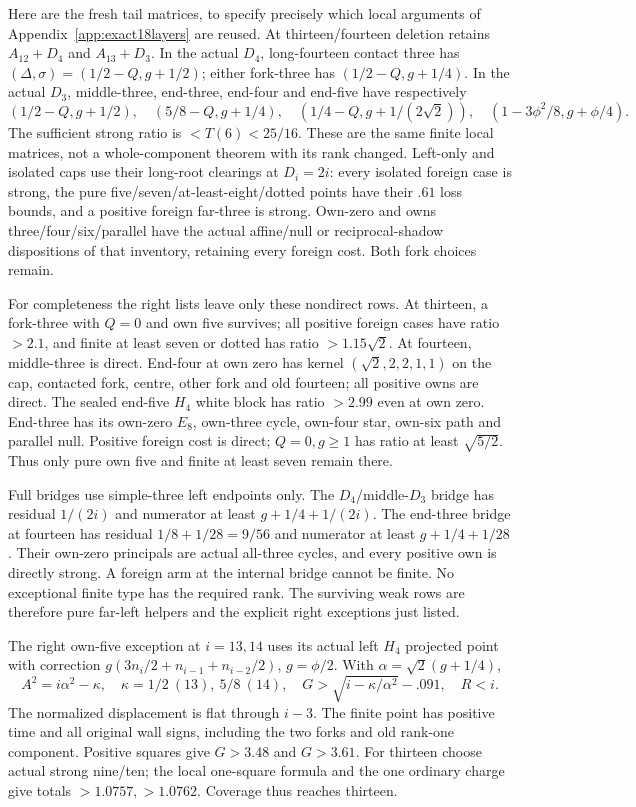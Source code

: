\documentclass[11pt]{article}
\theoremstyle{definition}
\theoremstyle{remark}
\begin{document}
Here are the fresh tail matrices, to specify precisely which local
arguments of Appendix~\ref{app:exact18layers} are reused. At
thirteen/fourteen deletion retains \(A_{12}+D_4\) and
\(A_{13}+D_3\). In the actual \(D_4\), long-fourteen contact
three has \((\Delta,\sigma)=(1/2-Q,g+1/2)\); either fork-three
has \((1/2-Q,g+1/4)\). In the actual \(D_3\), middle-three,
end-three, end-four and end-five have respectively
\[
 (1/2-Q,g+1/2),\quad(5/8-Q,g+1/4),\quad
 (1/4-Q,g+1/(2\sqrt2)),\quad
 (1-3\phi^2/8,g+\phi/4).
\]
The sufficient strong ratio is \(<T(6)<25/16\).
These are the same finite local matrices, not a whole-component
theorem with its rank changed. Left-only and isolated caps use
their long-root clearings at \(D_i=2i\): every isolated foreign
case is strong, the pure five/seven/at-least-eight/dotted points
have their \(.61\) loss bounds, and a positive foreign far-three
is strong. Own-zero and owns three/four/six/parallel have the
actual affine/null or reciprocal-shadow dispositions of that
inventory, retaining every foreign cost. Both fork choices remain.

For completeness the right lists leave only these nondirect rows.
At thirteen, a fork-three with \(Q=0\) and own five survives;
all positive foreign cases have ratio \(>2.1\), and finite at
least seven or dotted has ratio \(>1.15\sqrt2\).
At fourteen, middle-three is direct. End-four at own zero has
kernel \((\sqrt2,2,2,1,1)\) on the cap, contacted fork,
centre, other fork and old fourteen; all positive owns are direct.
The sealed end-five \(H_4\) white block has ratio \(>2.99\)
even at own zero. End-three has its own-zero \(E_8\), own-three
cycle, own-four star, own-six path and parallel null. Positive
foreign cost is direct; \(Q=0,g\ge1\) has ratio at least
\(\sqrt{5/2}\). Thus only pure own five and finite at least
seven remain there.

Full bridges use simple-three left endpoints only. The
\(D_4\)/middle-\(D_3\) bridge has residual \(1/(2i)\)
and numerator at least \(g+1/4+1/(2i)\). The end-three bridge
at fourteen has residual \(1/8+1/28=9/56\) and numerator
at least \(g+1/4+1/28\). Their own-zero principals are actual
all-three cycles, and every positive own is directly strong.
A foreign arm at the internal bridge cannot be finite. No
exceptional finite type has the required rank. The surviving weak
rows are therefore pure far-left helpers and the explicit right
exceptions just listed.

The right own-five exception at \(i=13,14\) uses its actual
left \(H_4\) projected point with correction
\(g(3n_i/2+n_{i-1}+n_{i-2}/2)\), \(g=\phi/2\).
With \(\alpha=\sqrt2(g+1/4)\),
\[
 A^2=i\alpha^2-\kappa,\quad
 \kappa=1/2\ (13),\ 5/8\ (14),\quad
 G>\sqrt{i-\kappa/\alpha^2}-.091,
 \quad R<i.
\]
The normalized displacement is flat through \(i-3\). The finite
point has positive time and all original wall signs, including the
two forks and old rank-one component. Positive squares give
\(G>3.48\) and \(G>3.61\). For thirteen choose actual strong
nine/ten; the local one-square formula and the one ordinary charge
give totals \(>1.0757,>1.0762\). Coverage thus reaches thirteen.
\end{document}
